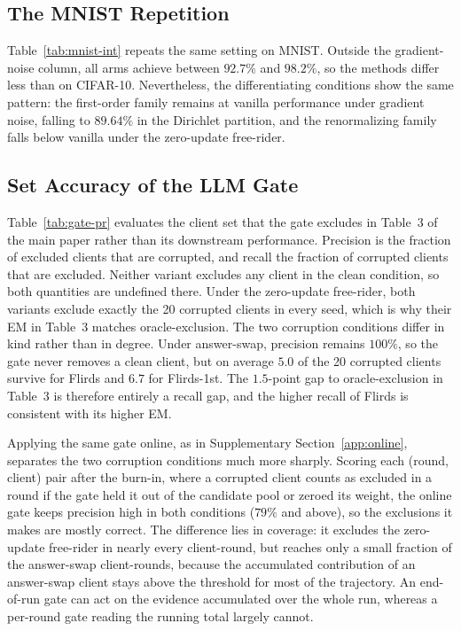 \documentclass[letterpaper]{article} %
\theoremstyle{plain}
\begin{document}
\subsection{The MNIST Repetition}
\label{app:mnist-rep}

Table~\ref{tab:mnist-int} repeats the same setting on MNIST. Outside the
gradient-noise column, all arms achieve between $92.7\%$ and $98.2\%$, so the
methods differ less than on CIFAR-10. Nevertheless, the differentiating
conditions show the same pattern: the first-order family remains at vanilla
performance under gradient noise, falling to $89.64\%$ in the Dirichlet
partition, and the renormalizing family falls below vanilla under the
zero-update free-rider.

\subsection{Set Accuracy of the LLM Gate}
\label{app:gate-sets}

Table~\ref{tab:gate-pr} evaluates the client set that the gate excludes in
Table~3 of the main paper rather than its downstream performance. Precision is
the fraction of excluded clients that are corrupted, and recall the fraction
of corrupted clients that are excluded. Neither variant excludes any client in
the clean condition, so both quantities are undefined there. Under the
zero-update free-rider, both variants exclude exactly the 20 corrupted clients
in every seed, which is why their EM in Table~3 matches oracle-exclusion.
The two corruption conditions differ in kind rather than in degree. Under
answer-swap, precision remains $100\%$, so the gate never removes a clean
client, but on average $5.0$ of the 20 corrupted clients survive for Flirds
and $6.7$ for Flirds-1st. The $1.5$-point gap to oracle-exclusion in Table~3 is
therefore entirely a recall gap, and the higher recall of Flirds is consistent
with its higher EM.

Applying the same gate online, as in Supplementary
Section~\ref{app:online}, separates the two corruption conditions much more
sharply. Scoring each (round, client) pair after the burn-in, where a
corrupted client counts as excluded in a round if the gate held it out of the
candidate pool or zeroed its weight, the online gate keeps precision high in
both conditions ($79\%$ and above), so the exclusions it makes are mostly
correct. The difference lies in coverage: it excludes the zero-update
free-rider in nearly every client-round, but reaches only a small fraction of
the answer-swap client-rounds, because the accumulated contribution of an
answer-swap client stays above the threshold for most of the trajectory. An
end-of-run gate can act on the evidence accumulated over the whole run,
whereas a per-round gate reading the running total largely cannot.
\end{document}
